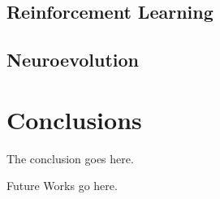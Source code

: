\documentclass[conference]{IEEEtran}
\begin{document}
\subsection{Reinforcement Learning}

\subsection{Neuroevolution}




\section{Conclusions}
The conclusion goes here. 

Future Works go here.












\end{document}
